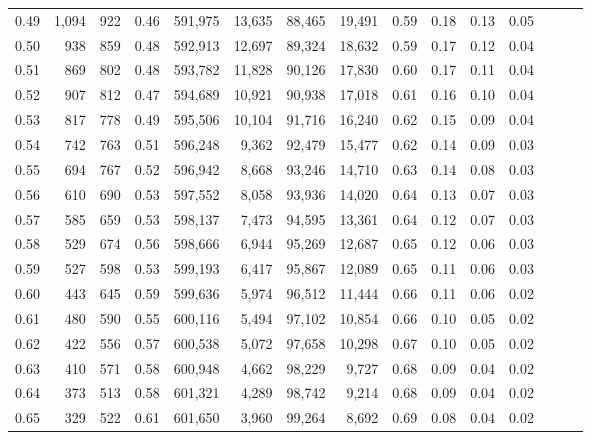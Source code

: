 \begin{tabular}{rrrrrrrrrrrrrrr}
0.49 &   1,094 &    922 &  0.46 &  591,975 &   13,635 &   88,465 &   19,491 &  0.59 &  0.18 &  0.13 &      0.05 \\
0.50 &     938 &    859 &  0.48 &  592,913 &   12,697 &   89,324 &   18,632 &  0.59 &  0.17 &  0.12 &      0.04 \\
0.51 &     869 &    802 &  0.48 &  593,782 &   11,828 &   90,126 &   17,830 &  0.60 &  0.17 &  0.11 &      0.04 \\
0.52 &     907 &    812 &  0.47 &  594,689 &   10,921 &   90,938 &   17,018 &  0.61 &  0.16 &  0.10 &      0.04 \\
0.53 &     817 &    778 &  0.49 &  595,506 &   10,104 &   91,716 &   16,240 &  0.62 &  0.15 &  0.09 &      0.04 \\
0.54 &     742 &    763 &  0.51 &  596,248 &    9,362 &   92,479 &   15,477 &  0.62 &  0.14 &  0.09 &      0.03 \\
0.55 &     694 &    767 &  0.52 &  596,942 &    8,668 &   93,246 &   14,710 &  0.63 &  0.14 &  0.08 &      0.03 \\
0.56 &     610 &    690 &  0.53 &  597,552 &    8,058 &   93,936 &   14,020 &  0.64 &  0.13 &  0.07 &      0.03 \\
0.57 &     585 &    659 &  0.53 &  598,137 &    7,473 &   94,595 &   13,361 &  0.64 &  0.12 &  0.07 &      0.03 \\
0.58 &     529 &    674 &  0.56 &  598,666 &    6,944 &   95,269 &   12,687 &  0.65 &  0.12 &  0.06 &      0.03 \\
0.59 &     527 &    598 &  0.53 &  599,193 &    6,417 &   95,867 &   12,089 &  0.65 &  0.11 &  0.06 &      0.03 \\
0.60 &     443 &    645 &  0.59 &  599,636 &    5,974 &   96,512 &   11,444 &  0.66 &  0.11 &  0.06 &      0.02 \\
0.61 &     480 &    590 &  0.55 &  600,116 &    5,494 &   97,102 &   10,854 &  0.66 &  0.10 &  0.05 &      0.02 \\
0.62 &     422 &    556 &  0.57 &  600,538 &    5,072 &   97,658 &   10,298 &  0.67 &  0.10 &  0.05 &      0.02 \\
0.63 &     410 &    571 &  0.58 &  600,948 &    4,662 &   98,229 &    9,727 &  0.68 &  0.09 &  0.04 &      0.02 \\
0.64 &     373 &    513 &  0.58 &  601,321 &    4,289 &   98,742 &    9,214 &  0.68 &  0.09 &  0.04 &      0.02 \\
0.65 &     329 &    522 &  0.61 &  601,650 &    3,960 &   99,264 &    8,692 &  0.69 &  0.08 &  0.04 &      0.02 \\

\end{tabular}
